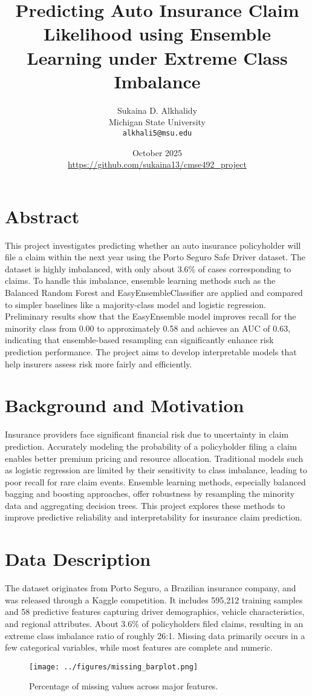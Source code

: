 \documentclass[11pt]{article}
\title{Predicting Auto Insurance Claim Likelihood using Ensemble Learning under Extreme Class Imbalance}
\author{Sukaina D. Alkhalidy \\ Michigan State University \\ \texttt{alkhali5@msu.edu}}
\date{October 2025 \\ \url{https://github.com/sukaina13/cmse492_project}}
\begin{document}
\maketitle

\section*{Abstract}
This project investigates predicting whether an auto insurance policyholder will file a claim within the next year using the Porto Seguro Safe Driver dataset. The dataset is highly imbalanced, with only about 3.6\% of cases corresponding to claims. To handle this imbalance, ensemble learning methods such as the Balanced Random Forest and EasyEnsembleClassifier are applied and compared to simpler baselines like a majority-class model and logistic regression. Preliminary results show that the EasyEnsemble model improves recall for the minority class from 0.00 to approximately 0.58 and achieves an AUC of 0.63, indicating that ensemble-based resampling can significantly enhance risk prediction performance. The project aims to develop interpretable models that help insurers assess risk more fairly and efficiently.

\section{Background and Motivation}
Insurance providers face significant financial risk due to uncertainty in claim prediction. Accurately modeling the probability of a policyholder filing a claim enables better premium pricing and resource allocation. Traditional models such as logistic regression are limited by their sensitivity to class imbalance, leading to poor recall for rare claim events. Ensemble learning methods, especially balanced bagging and boosting approaches, offer robustness by resampling the minority data and aggregating decision trees. This project explores these methods to improve predictive reliability and interpretability for insurance claim prediction.

\section{Data Description}
The dataset originates from Porto Seguro, a Brazilian insurance company, and was released through a Kaggle competition. It includes 595,212 training samples and 58 predictive features capturing driver demographics, vehicle characteristics, and regional attributes. About 3.6\% of policyholders filed claims, resulting in an extreme class imbalance ratio of roughly 26:1. Missing data primarily occurs in a few categorical variables, while most features are complete and numeric.
\begin{figure}[h]
    \centering
    \texttt{[image: ../figures/missing\_barplot.png]}
    \caption{Percentage of missing values across major features.}
\end{figure}
\end{document}
